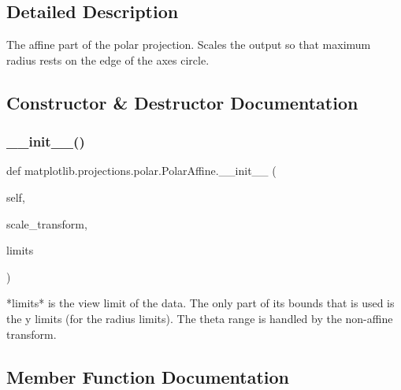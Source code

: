 \subsection{Detailed Description}
\begin{DoxyVerb}The affine part of the polar projection.  Scales the output so
that maximum radius rests on the edge of the axes circle.
\end{DoxyVerb}
 

\subsection{Constructor \& Destructor Documentation}
\mbox{\label{classmatplotlib_1_1projections_1_1polar_1_1PolarAffine_ad000b3b3040c383ccc4b1d3f6a53b90d}} 
\subsubsection{\texorpdfstring{\+\_\+\+\_\+init\+\_\+\+\_\+()}{\_\_init\_\_()}}
{\footnotesize\ttfamily def matplotlib.\+projections.\+polar.\+Polar\+Affine.\+\_\+\+\_\+init\+\_\+\+\_\+ (\begin{DoxyParamCaption}\item[{}]{self,  }\item[{}]{scale\+\_\+transform,  }\item[{}]{limits }\end{DoxyParamCaption})}

\begin{DoxyVerb}*limits* is the view limit of the data.  The only part of
its bounds that is used is the y limits (for the radius limits).
The theta range is handled by the non-affine transform.
\end{DoxyVerb}
 

\subsection{Member Function Documentation}
\mbox{\label{classmatplotlib_1_1projections_1_1polar_1_1PolarAffine_a59a9449fa82d0ce186659bd816d6e441}} 
